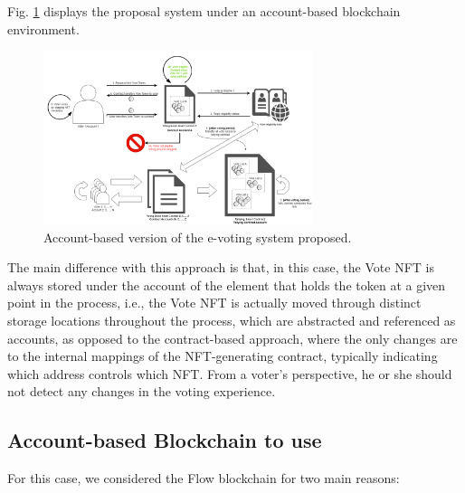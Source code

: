 \documentclass[./4_GeneralApproach.tex]{subfiles}
\begin{document}
Fig. \ref{fig:account_based_architecture} displays the proposal system under an account-based blockchain environment.

\begin{figure}[htp]
    \centering
    \includegraphics[width=0.7\textwidth]{../Images/03_account_based_solution.png}
    \caption{Account-based version of the e-voting system proposed.}
    \label{fig:account_based_architecture}
\end{figure}

The main difference with this approach is that, in this case, the Vote NFT is always stored under the account of the element that holds the token at a given point in the process, i.e., the Vote NFT is actually moved through distinct storage locations throughout the process, which are abstracted and referenced as accounts, as opposed to the contract-based approach, where the only changes are to the internal mappings of the NFT-generating contract, typically indicating which address controls which NFT. From a voter's perspective, he or she should not detect any changes in the voting experience.

\subsection{Account-based Blockchain to use}
For this case, we considered the Flow blockchain for two main reasons:
\end{document}
